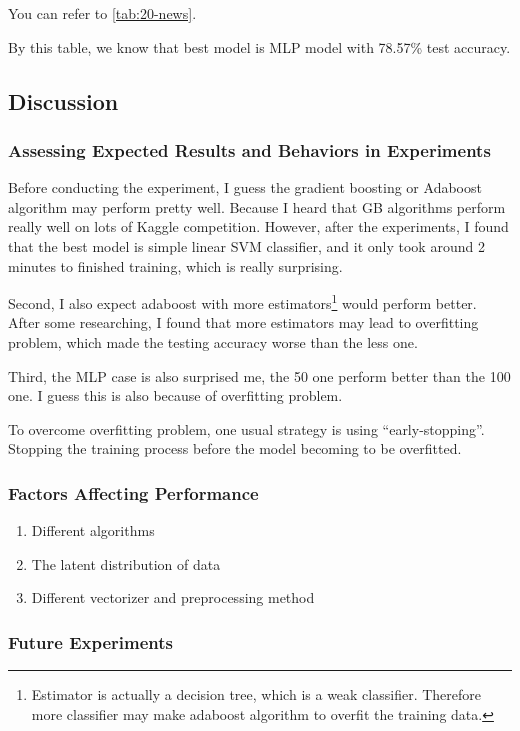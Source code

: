 \documentclass[twocolumn]{extarticle}
\begin{document}
You can refer to \autoref{tab:20-news}.

By this table, we know that best model is MLP model with 78.57\% test accuracy.

\subsection{Discussion}
\subsubsection{Assessing Expected Results and Behaviors in Experiments}

Before conducting the experiment, I guess the gradient boosting or Adaboost algorithm may perform pretty well. Because I heard that GB algorithms perform really well on lots of Kaggle competition. However, after the experiments, I found that the best model is simple linear SVM classifier, and it only took around 2 minutes to finished training, which is really surprising.

Second, I also expect adaboost with more estimators\footnote{Estimator is actually a decision tree, which is a weak classifier. Therefore more classifier may make adaboost algorithm to overfit the training data.} would perform better. After some researching, I found that more estimators may lead to overfitting problem, which made the testing accuracy worse than the less one.

Third, the MLP case is also surprised me, the 50 one perform better than the 100 one. I guess this is also because of overfitting problem. 

To overcome overfitting problem, one usual strategy is using ``early-stopping''. Stopping the training process before the model becoming to be overfitted.

\subsubsection{Factors Affecting Performance}

\begin{enumerate}
\item Different algorithms
\item The latent distribution of data
\item Different vectorizer and preprocessing method
\end{enumerate}

\subsubsection{Future Experiments}
\end{document}
